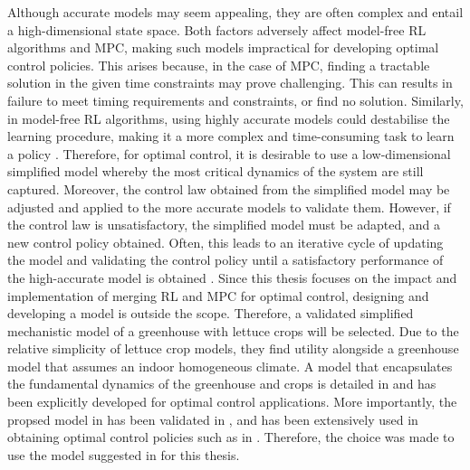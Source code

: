 Although accurate models may seem appealing, they are often complex and entail a high-dimensional state space. Both factors adversely affect model-free RL algorithms and MPC, making such models impractical for developing optimal control policies. This arises because, in the case of MPC, finding a tractable solution in the given time constraints may prove challenging. This can results in failure to meet timing requirements and constraints, or find no solution. Similarly, in model-free RL algorithms, using highly accurate models could destabilise the learning procedure, making it a more complex and time-consuming task to learn a policy \cite{lawrynczukMPCAlgorithms2014,dulac-arnoldChallengesRealWorldReinforcement2019}. Therefore, for optimal control, it is desirable to use a low-dimensional simplified model whereby the most critical dynamics of the system are still captured. Moreover, the control law obtained from the simplified model may be adjusted and applied to the more accurate models to validate them. However, if the control law is unsatisfactory, the simplified model must be adapted, and a new control policy obtained. Often, this leads to an iterative cycle of updating the model and validating the control policy until a satisfactory performance of the high-accurate model is obtained \cite{knibbeDigitalTwinsGreen2022}. Since this thesis focuses on the impact and implementation of merging RL and MPC for optimal control, designing and developing a model is outside the scope.
Therefore, a validated simplified mechanistic model of a greenhouse with lettuce crops will be selected.
Due to the relative simplicity of lettuce crop models, they find utility alongside a greenhouse model that assumes an indoor homogeneous climate. A model that encapsulates the fundamental dynamics of the greenhouse and crops is detailed in \citet{hentenGreenhouseClimateManagement1994} and has been explicitly developed for optimal control applications. More importantly, the propsed model in \citet{hentenGreenhouseClimateManagement1994} has been validated in \citet{vanhentenValidationDynamicLettuce1994}, and has been extensively used in obtaining optimal control policies such as in \citet{jansenOptimalControlLettuce2023,vanstratenOptimalGreenhouseCultivation2010,ghoumariNonlinearConstrainedMPC2005,lubbersAutonomousGreenhouseClimate2023, morcegoReinforcementLearningModel2023}. Therefore, the choice was made to use the model suggested in \citet{hentenGreenhouseClimateManagement1994} for this thesis.



